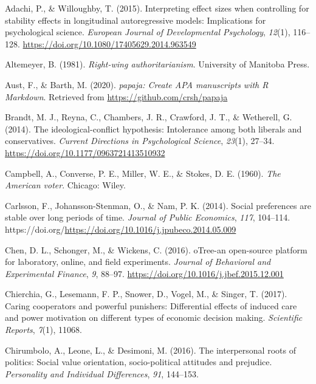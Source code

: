 \documentclass[
  man,floatsintext]{apa6}
\newlength{\cslhangindent}
\newlength{\cslentryspacingunit} %
\newenvironment{CSLReferences}[2] %
 {%
  \setlength{\parindent}{0pt}
  \ifodd #1
  \let\oldpar\par
  \def\par{\hangindent=\cslhangindent\oldpar}
  \fi
  \setlength{\parskip}{#2\cslentryspacingunit}
 }%
 {}
\begin{document}
\hypertarget{refs}{}
\begin{CSLReferences}{1}{0}
\leavevmode{}%
Adachi, P., \& Willoughby, T. (2015). Interpreting effect sizes when controlling for stability effects in longitudinal autoregressive models: Implications for psychological science. \emph{European Journal of Developmental Psychology}, \emph{12}(1), 116--128. \url{https://doi.org/10.1080/17405629.2014.963549}

\leavevmode{}%
Altemeyer, B. (1981). \emph{Right-wing authoritarianism}. University of Manitoba Press.

\leavevmode{}%
Aust, F., \& Barth, M. (2020). \emph{{papaja}: {Create} {APA} manuscripts with {R Markdown}}. Retrieved from \url{https://github.com/crsh/papaja}

\leavevmode{}%
Brandt, M. J., Reyna, C., Chambers, J. R., Crawford, J. T., \& Wetherell, G. (2014). The ideological-conflict hypothesis: Intolerance among both liberals and conservatives. \emph{Current Directions in Psychological Science}, \emph{23}(1), 27--34. \url{https://doi.org/10.1177/0963721413510932}

\leavevmode{}%
Campbell, A., Converse, P. E., Miller, W. E., \& Stokes, D. E. (1960). \emph{The {A}merican voter}. Chicago: Wiley.

\leavevmode{}%
Carlsson, F., Johansson-Stenman, O., \& Nam, P. K. (2014). Social preferences are stable over long periods of time. \emph{Journal of Public Economics}, \emph{117}, 104--114. https://doi.org/\url{https://doi.org/10.1016/j.jpubeco.2014.05.009}

\leavevmode{}%
Chen, D. L., Schonger, M., \& Wickens, C. (2016). {oTree}-an open-source platform for laboratory, online, and field experiments. \emph{Journal of Behavioral and Experimental Finance}, \emph{9}, 88--97. \url{https://doi.org/10.1016/j.jbef.2015.12.001}

\leavevmode{}%
Chierchia, G., Lesemann, F. P., Snower, D., Vogel, M., \& Singer, T. (2017). Caring cooperators and powerful punishers: Differential effects of induced care and power motivation on different types of economic decision making. \emph{Scientific Reports}, \emph{7}(1), 11068.

\leavevmode{}%
Chirumbolo, A., Leone, L., \& Desimoni, M. (2016). The interpersonal roots of politics: Social value orientation, socio-political attitudes and prejudice. \emph{Personality and Individual Differences}, \emph{91}, 144--153.


\end{CSLReferences}
\end{document}
